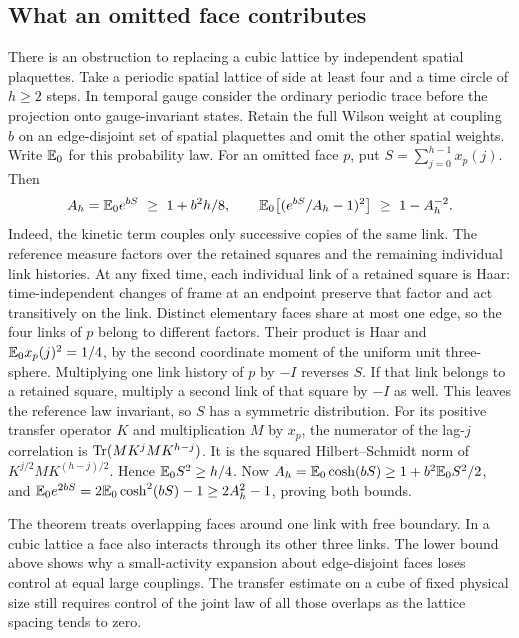 \subsection*{What an omitted face contributes}
There is an obstruction to replacing a cubic lattice by independent spatial
plaquettes. Take a periodic spatial lattice of side at least four and a
time circle of \(h\ge2\) steps. In temporal gauge consider the ordinary
periodic trace before the projection onto gauge-invariant states.
Retain the full Wilson weight at coupling \(b\) on an edge-disjoint set
of spatial plaquettes and omit the other spatial weights. Write \(\mathbb{E}_0\)
for this probability law. For an omitted face \(p\), put
\(S=\sum_{j=0}^{h-1}x_p(j)\). Then
\[
 A_h=\mathbb{E}_0 e^{bS}\ \ge\ 1+b^2h/8,\qquad
 \mathbb{E}_0\big[(e^{bS}/A_h-1)^2\big]\ \ge\ 1-A_h^{-2}.
\]
Indeed, the kinetic term couples only successive copies of the same link.
The reference measure factors over the retained squares and the remaining
individual link histories. At any fixed time, each individual link of a
retained square is Haar: time-independent changes of frame at an endpoint
preserve that factor and act transitively on the link. Distinct elementary
faces share at most one edge, so the four links of \(p\) belong to different
factors. Their product is Haar and \(\mathbb{E}_0 x_p(j)^2=1/4\), by the second
coordinate moment of the uniform unit three-sphere. Multiplying one link
history of \(p\) by \(-I\) reverses \(S\). If that link belongs to a retained
square, multiply a second link of that square by \(-I\) as well. This leaves
the reference law invariant, so \(S\) has a symmetric distribution.
For its positive transfer operator \(K\) and multiplication \(M\) by \(x_p\),
the numerator of the lag-\(j\) correlation is \(\operatorname{Tr}(MK^jMK^{h-j})\).
It is the squared Hilbert--Schmidt norm of
\(K^{j/2} M K^{(h-j)/2}\). Hence \(\mathbb{E}_0 S^2\ge h/4\). Now
\(A_h=\mathbb{E}_0\cosh(bS)\ge1+b^2\mathbb{E}_0 S^2/2\), and
\(\mathbb{E}_0e^{2bS}=2\mathbb{E}_0\cosh^2(bS)-1\ge2A_h^2-1\), proving both bounds.

The theorem treats overlapping faces around one link with free boundary.
In a cubic lattice a face also interacts through its other three links.
The lower bound above shows why a small-activity expansion about
edge-disjoint faces loses control at equal large couplings. The transfer
estimate on a cube of fixed physical size still requires control of the
joint law of all those overlaps as the lattice spacing tends to zero.
